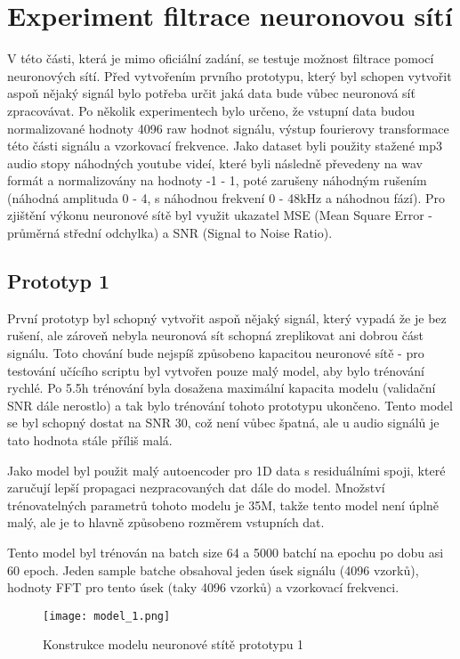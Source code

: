 \section{Experiment filtrace neuronovou sítí}

V této části, která je mimo oficiální zadání, se testuje možnost filtrace pomocí neuronových sítí.
Před vytvořením prvního prototypu, který byl schopen vytvořit aspoň nějaký signál bylo potřeba určit jaká data bude vůbec neuronová síť zpracovávat.
Po několik experimentech bylo určeno, že vstupní data budou normalizované hodnoty 4096 raw hodnot signálu, výstup fourierovy transformace této části signálu a vzorkovací frekvence.
Jako dataset byli použity stažené mp3 audio stopy náhodných youtube videí, které byli následně převedeny na wav formát a normalizovány na hodnoty -1 - 1, poté zarušeny náhodným rušením (náhodná amplituda 0 - 4, s náhodnou frekvení 0 - 48kHz a náhodnou fází).
Pro zjištění výkonu neuronové sítě byl využit ukazatel MSE (Mean Square Error - průměrná střední odchylka) a SNR (Signal to Noise Ratio).


\subsection{Prototyp 1}

První prototyp byl schopný vytvořit aspoň nějaký signál, který vypadá že je bez rušení, ale zároveň nebyla neuronová sít schopná zreplikovat ani dobrou část signálu.
Toto chování bude nejspíš způsobeno kapacitou neuronové sítě - pro testování učícího scriptu byl vytvořen pouze malý model, aby bylo trénování rychlé.
Po 5.5h trénování byla dosažena maximální kapacita modelu (validační SNR dále nerostlo) a tak bylo trénování tohoto prototypu ukončeno.
Tento model se byl schopný dostat na SNR 30, což není vůbec špatná, ale u audio signálů je tato hodnota stále příliš malá.

Jako model byl použit malý autoencoder pro 1D data s residuálními spoji, které zaručují lepší propagaci nezpracovaných dat dále do model.
Množství trénovatelných parametrů tohoto modelu je 35M, takže tento model není úplně malý, ale je to hlavně způsobeno rozměrem vstupních dat.

Tento model byl trénován na batch size 64 a 5000 batchí na epochu po dobu asi 60 epoch. Jeden sample batche obsahoval jeden úsek signálu (4096 vzorků), hodnoty FFT pro tento úsek (taky 4096 vzorků) a vzorkovací frekvenci.

\begin{figure}[H] 
	\centering
	\texttt{[image: model\_1.png]}
	\caption{Konstrukce modelu neuronové stítě prototypu 1}
\end{figure}

